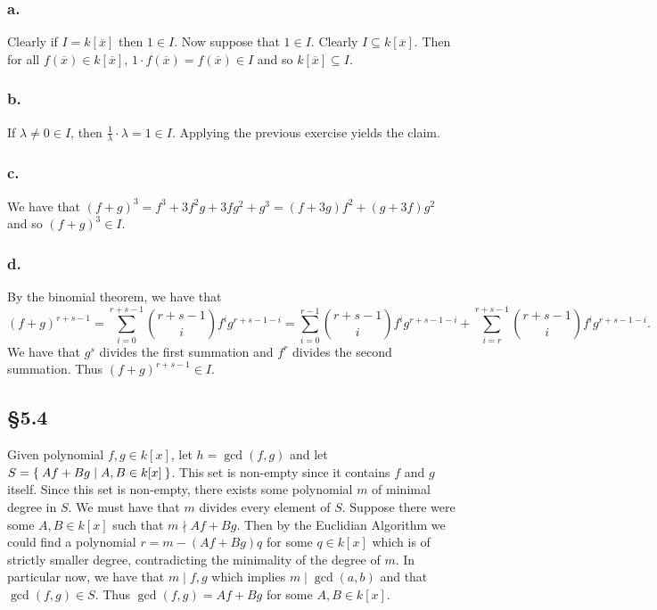 \documentclass[letterpaper]{article}
\begin{document}
\subsubsection*{a.}

Clearly if $I = k[\overline{x}]$ then $1 \in I$.
Now suppose that $1 \in I$.
Clearly $I \subseteq k[\overline{x}]$.
Then for all $f(\overline{x}) \in k[\overline{x}]$, $1 \cdot f(\overline{x}) = f(\overline{x}) \in I$ and so $k[\overline{x}] \subseteq I$.

\subsubsection*{b.}

If $\lambda \neq 0 \in I$, then $\frac{1}{\lambda} \cdot \lambda = 1 \in I$.
Applying the previous exercise yields the claim.

\subsubsection*{c.}

We have that $(f + g)^{3} = f^{3} + 3f^{2}g + 3fg^{2} + g^{3} = (f + 3g)f^{2} + (g + 3f)g^{2}$ and so $(f + g)^{3} \in I$.

\subsubsection*{d.}

By the binomial theorem, we have that
\[
  (f + g)^{r + s - 1} = \sum_{i = 0}^{r + s - 1} \binom{r + s - 1}{i} f^{i} g^{r + s - 1 - i} = \sum_{i = 0}^{r - 1} \binom{r + s - 1}{i} f^{i} g^{r + s - 1 - i} + \sum_{i = r}^{r + s - 1} \binom{r + s - 1}{i} f^{i} g^{r + s - 1 - i}.
\]
We have that $g^{s}$ divides the first summation and $f^{r}$ divides the second summation.
Thus $(f + g)^{r + s - 1} \in I$.

\subsection*{\S 5.4}

Given polynomial $f, g \in k[x]$, let $h = \gcd(f, g)$ and let $S = \Set{Af + Bg | A, B \in k[x]}$. This set is non-empty since it contains $f$ and $g$ itself. Since this set is non-empty, there exists some polynomial $m$ of minimal degree in $S$. We must have that $m$ divides every element of $S$. Suppose there were some $A, B \in k[x]$ such that $m \nmid Af + Bg$. Then by the Euclidian Algorithm we could find a polynomial $r = m - (Af + Bg)q$ for some $q \in k[x]$ which is of strictly smaller degree, contradicting the minimality of the degree of $m$. In particular now, we have that $m \mid f, g$ which implies $m \mid \gcd(a, b)$ and that $\gcd(f, g) \in S$. Thus $\gcd(f, g) = Af + Bg$ for some $A, B \in k[x]$.
\end{document}
